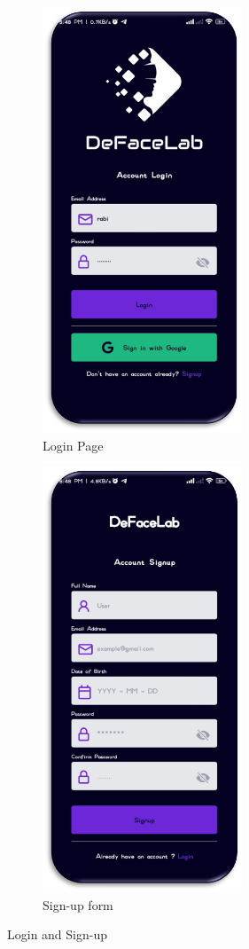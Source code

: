 \begin{figure}[ht]
    \centering
    \begin{subfigure}[b]{0.45\textwidth}
        \centering
        \includegraphics[height=5in]{img/loginv3.png}
        \caption{{Login Page}}
    \end{subfigure}
    \hfill
    \begin{subfigure}[b]{0.45\textwidth}
        \centering
        \includegraphics[height=5in]{img/signup.png}
        \caption{{Sign-up form}}
    \end{subfigure}
    \caption{Login and Sign-up}
\end{figure}

